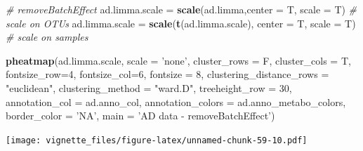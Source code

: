 \documentclass[]{book}
\newenvironment{Shaded}{\begin{snugshade}}{\end{snugshade}}
\newcommand{\KeywordTok}[1]{\textcolor[rgb]{0.13,0.29,0.53}{\textbf{#1}}}
\newcommand{\DataTypeTok}[1]{\textcolor[rgb]{0.13,0.29,0.53}{#1}}
\newcommand{\DecValTok}[1]{\textcolor[rgb]{0.00,0.00,0.81}{#1}}
\newcommand{\StringTok}[1]{\textcolor[rgb]{0.31,0.60,0.02}{#1}}
\newcommand{\CommentTok}[1]{\textcolor[rgb]{0.56,0.35,0.01}{\textit{#1}}}
\newcommand{\NormalTok}[1]{#1}
\begin{document}
\begin{Shaded}
\begin{Highlighting}[]
\CommentTok{# removeBatchEffect}
\NormalTok{ad.limma.scale =}\StringTok{ }\KeywordTok{scale}\NormalTok{(ad.limma,}\DataTypeTok{center =}\NormalTok{ T, }\DataTypeTok{scale =}\NormalTok{ T) }\CommentTok{# scale on OTUs}
\NormalTok{ad.limma.scale =}\StringTok{ }\KeywordTok{scale}\NormalTok{(}\KeywordTok{t}\NormalTok{(ad.limma.scale), }\DataTypeTok{center =}\NormalTok{ T, }\DataTypeTok{scale =}\NormalTok{ T) }\CommentTok{# scale on samples}

\KeywordTok{pheatmap}\NormalTok{(ad.limma.scale, }
         \DataTypeTok{scale =} \StringTok{'none'}\NormalTok{, }
         \DataTypeTok{cluster_rows =}\NormalTok{ F, }
         \DataTypeTok{cluster_cols =}\NormalTok{ T, }
         \DataTypeTok{fontsize_row=}\DecValTok{4}\NormalTok{, }\DataTypeTok{fontsize_col=}\DecValTok{6}\NormalTok{,}
         \DataTypeTok{fontsize =} \DecValTok{8}\NormalTok{,}
         \DataTypeTok{clustering_distance_rows =} \StringTok{"euclidean"}\NormalTok{,}
         \DataTypeTok{clustering_method =} \StringTok{"ward.D"}\NormalTok{,}
         \DataTypeTok{treeheight_row =} \DecValTok{30}\NormalTok{,}
         \DataTypeTok{annotation_col =}\NormalTok{ ad.anno_col,}
         \DataTypeTok{annotation_colors =}\NormalTok{ ad.anno_metabo_colors,}
         \DataTypeTok{border_color =} \StringTok{'NA'}\NormalTok{,}
         \DataTypeTok{main =} \StringTok{'AD data - removeBatchEffect'}\NormalTok{)}
\end{Highlighting}
\end{Shaded}

\texttt{[image: vignette\_files/figure-latex/unnamed-chunk-59-10.pdf]}
\end{document}
